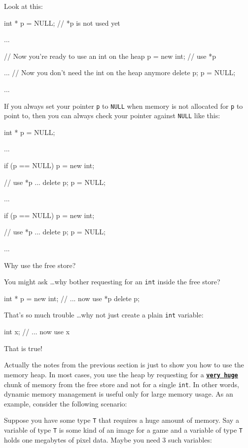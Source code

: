 Look at this:

\begin{consolethree}[escapeinside=||]
int * p = NULL;
// *p is not used yet

...

// Now you're ready to use an int on the heap
p = new int;
// use *p

...
// Now you don't need the int on the heap anymore
delete p;
p = NULL;

...
\end{consolethree}
If you always set your pointer \texttt{p} to \texttt{NULL} when memory is not allocated for \texttt{p} to point to, then you can always check your pointer against \texttt{NULL} like this:

\begin{consolethree}[escapeinside=||]
int * p = NULL;

...

if (p == NULL)
{
    p = new int;
}

// use *p ...
delete p;
p = NULL;

...

if (p == NULL)
{
    p = new int;
}

// use *p ...
delete p;
p = NULL;

...
\end{consolethree}
Why use the free store?

You might ask \ldots why bother requesting for an \texttt{int} inside the free store?

\begin{consolethree}[escapeinside=||]
int * p = new int;
// ... now use *p
delete p;
\end{consolethree}
That's so much trouble \ldots why not just create a plain \texttt{int} variable:

\begin{consolethree}[escapeinside=||]
int x;
// ... now use x
\end{consolethree}
That is true!

Actually the notes from the previous section is just to show you how to use the memory heap. In most cases, you use the heap by requesting for a \texttt{\textbf{\underline{very huge}}} chunk of memory from the free store and not for a single \texttt{int}. In other words, dynamic memory management is useful only for large memory usage. As an example, consider the following scenario:

Suppose you have some type \texttt{T} that requires a huge amount of memory. Say a variable of type \texttt{T} is some kind of an image for a game and a variable of type \texttt{T} holds one megabytes of pixel data. Maybe you need 3 such variables:

